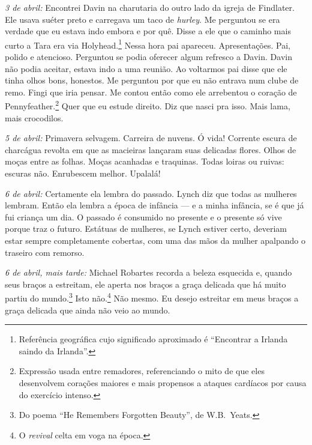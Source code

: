 \medskip\noindent\textit{3 de abril:} Encontrei Davin na charutaria do outro lado da
igreja de Findlater. Ele usava suéter preto e carregava um taco de
\textit{hurley}. Me perguntou se era verdade que eu estava indo embora
e por quê. Disse a ele que o caminho mais curto a Tara era via
Holyhead.\footnote{ Referência geográfica cujo significado aproximado é
“Encontrar a Irlanda saindo da Irlanda”.} Nessa hora pai apareceu.
Apresentações. Pai, polido e atencioso. Perguntou se podia oferecer
algum refresco a Davin. Davin não podia aceitar, estava indo a uma
reunião. Ao voltarmos pai disse que ele tinha olhos bons, honestos. Me
perguntou por que eu não entrava num clube de remo. Fingi que iria
pensar. Me contou então como ele arrebentou o coração de
Pennyfeather.\footnote{ Expressão usada entre remadores, referenciando o mito de  
que eles desenvolvem corações maiores e mais propensos a ataques
cardíacos por causa do exercício intenso.} Quer que eu estude direito.
Diz que nasci pra isso. Mais lama, mais crocodilos.

\medskip\noindent\textit{5 de abril:} Primavera selvagem. Carreira de nuvens. Ó vida!
Corrente escura de charcágua revolta em que as macieiras lançaram suas
delicadas flores. Olhos de moças entre as folhas. Moças acanhadas e
traquinas. Todas loiras ou ruivas: escuras não. Enrubescem melhor.
Upalalá!

\medskip\noindent\textit{6 de abril:} Certamente ela lembra do passado. Lynch diz que
todas as mulheres lembram. Então ela lembra a época de infância --- e a
minha infância, se é que já fui criança um dia. O passado é consumido
no presente e o presente só vive porque traz o futuro. Estátuas de
mulheres, se Lynch estiver certo, deveriam estar sempre completamente
cobertas, com uma das mãos da mulher apalpando o traseiro com remorso.

\medskip\noindent\textit{6 de abril, mais tarde:} Michael Robartes recorda a beleza
esquecida e, quando seus braços a estreitam, ele aperta nos braços a
graça delicada que há muito partiu do mundo.\footnote{ Do poema “He Remembers Forgotten Beauty”, de W.B.~Yeats.} 
Isto não.\footnote{ O \textit{revival} celta em voga na época.} Não mesmo. Eu desejo
estreitar em meus braços a graça delicada que ainda não veio ao mundo.

\medskip\noindent{}

